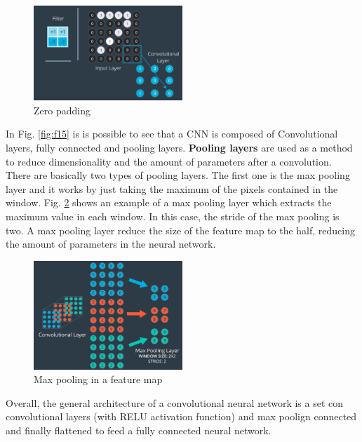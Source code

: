 \documentclass{article}
\begin{document}
\begin{figure}[ht]
    \centering
    \includegraphics[width=0.5\textwidth,height=0.5\textheight,keepaspectratio]{images/padding.png}
    \captionsetup{justification=centering}
    \caption{Zero padding}
    \label{fig:f20}
\end{figure}

In Fig. \ref{fig:f15} is is possible to see that a CNN is composed of Convolutional layers, fully connected and pooling layers. \textbf{Pooling layers} are used as a method to reduce dimensionality and the amount of parameters after a convolution. There are basically two types of pooling layers. The first one is the max pooling layer and it works by just taking the maximum of the pixels contained in the window. Fig. \ref{fig:f21} shows an example of a max pooling layer which extracts the maximum value in each window. In this case, the stride of the max pooling is two. A max pooling layer reduce the size of the feature map to the half, reducing the amount of parameters in the neural network.

\begin{figure}[ht]
    \centering
    \includegraphics[width=0.5\textwidth,height=0.5\textheight,keepaspectratio]{images/max_pooling.png}
    \captionsetup{justification=centering}
    \caption{Max pooling in a feature map}
    \label{fig:f21}
\end{figure}

Overall, the general architecture of a convolutional neural network is a set con convolutional layers (with RELU activation function) and max poolign connected and finally flattened to feed a fully connected neural network.

\printbibliography
\end{document}
